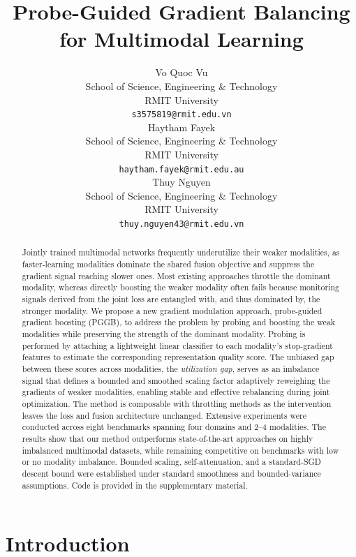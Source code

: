 \documentclass{article}
\title{Probe-Guided Gradient Balancing for Multimodal Learning}
\author{%
  Vo Quoc Vu \\
  School of Science, Engineering \& Technology \\
  RMIT University \\
  \texttt{s3575819@rmit.edu.vn} \\
  \And
  Haytham Fayek \\
  School of Science, Engineering \& Technology \\
  RMIT University \\
  \texttt{haytham.fayek@rmit.edu.au} \\
  \And
  Thuy Nguyen \\
  School of Science, Engineering \& Technology \\
  RMIT University \\
  \texttt{thuy.nguyen43@rmit.edu.vn} \\
}
\begin{document}
\maketitle


\begin{abstract}

Jointly trained multimodal networks frequently underutilize their weaker modalities, as faster-learning modalities dominate the shared fusion objective and suppress the gradient signal reaching slower ones. Most existing approaches throttle the dominant modality, whereas directly boosting the weaker modality often fails because monitoring signals derived from the joint loss are entangled with, and thus dominated by, the stronger modality.
We propose a new gradient modulation approach, probe-guided gradient boosting (PGGB), to address the problem by probing and boosting the weak modalities while preserving the strength of the dominant modality. 
Probing is performed by attaching a lightweight linear classifier to each modality’s stop-gradient features to estimate the corresponding representation quality score. The unbiased gap between these scores across modalities, the \emph{utilization gap}, serves as an imbalance signal that defines a bounded and smoothed scaling factor adaptively reweighing the gradients of weaker modalities, enabling stable and effective rebalancing during joint optimization.
The method is composable with throttling methods as the intervention leaves the loss and fusion architecture unchanged. 
Extensive experiments were conducted across eight benchmarks spanning four domains and 2–4 modalities. The results show that our method outperforms state-of-the-art approaches on highly imbalanced multimodal datasets, while remaining competitive on benchmarks with low or no modality imbalance.
Bounded scaling, self-attenuation, and a standard-SGD descent bound were established under standard smoothness and bounded-variance assumptions. 
Code is provided in the supplementary material.
\end{abstract}

\section{Introduction}
\label{sec:intro}

\end{document}
